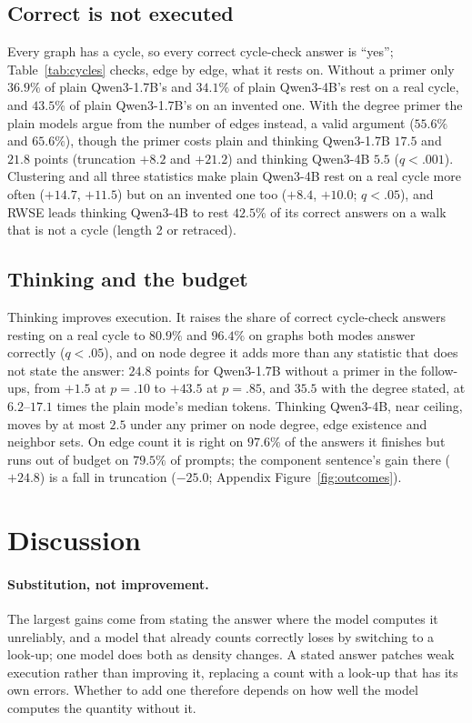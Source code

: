 \documentclass[11pt]{article}
\begin{document}

\subsection{Correct is not executed}
\label{sec:executed}
Every graph has a cycle, so every correct cycle-check answer is ``yes''; Table~\ref{tab:cycles} checks, edge by edge, what it rests on. Without a primer only $36.9\%$ of plain Qwen3-1.7B's and $34.1\%$ of plain Qwen3-4B's rest on a real cycle, and $43.5\%$ of plain Qwen3-1.7B's on an invented one. %
With the degree primer the plain models argue from the number of edges instead, a valid argument ($55.6\%$ and $65.6\%$), %
though the primer costs plain and thinking Qwen3-1.7B $17.5$ and $21.8$ points (truncation $+8.2$ and $+21.2$) and thinking Qwen3-4B $5.5$ ($q<.001$). %
Clustering and all three statistics make plain Qwen3-4B rest on a real cycle more often ($+14.7$, $+11.5$) but on an invented one too ($+8.4$, $+10.0$; $q<.05$), %
and RWSE leads thinking Qwen3-4B to rest $42.5\%$ of its correct answers on a walk that is not a cycle (length 2 or retraced). %

\subsection{Thinking and the budget}
Thinking improves execution. It raises the share of correct cycle-check answers resting on a real cycle to $80.9\%$ and $96.4\%$ on graphs both modes answer correctly ($q<.05$), %
and on node degree it adds more than any statistic that does not state the answer: $24.8$ points for Qwen3-1.7B without a primer in the follow-ups, from $+1.5$ at $p=.10$ to $+43.5$ at $p=.85$, and $35.5$ with the degree stated, at $6.2$--$17.1$ times the plain mode's median tokens. %
Thinking Qwen3-4B, near ceiling, moves by at most $2.5$ under any primer on node degree, edge existence and neighbor sets. %
On edge count it is right on $97.6\%$ of the answers it finishes but runs out of budget on $79.5\%$ of prompts; the component sentence's gain there ($+24.8$) is a fall in truncation ($-25.0$; Appendix Figure~\ref{fig:outcomes}). %

\section{Discussion}
\label{sec:discussion}
\paragraph{Substitution, not improvement.} The largest gains come from stating the answer where the model computes it unreliably, and a model that already counts correctly loses by switching to a look-up; one model does both as density changes. A stated answer patches weak execution rather than improving it, replacing a count with a look-up that has its own errors. Whether to add one therefore depends on how well the model computes the quantity without it.
\end{document}
